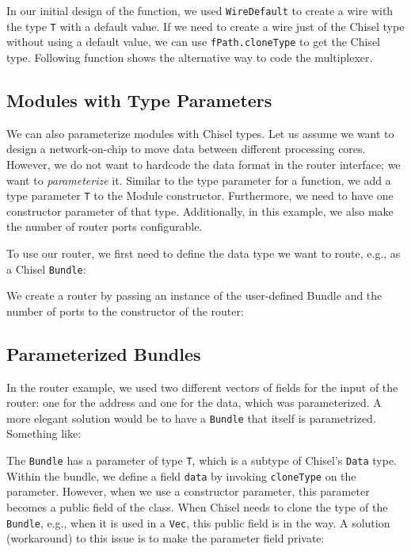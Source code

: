 \documentclass[%
    10pt,
    headinclude, footexclude,
    openright, %
    notitlepage,
    cleardoubleempty,
    headsepline,
    pointlessnumbers,
    bibtotoc, idxtotoc,
    ]{scrbook}
\newcommand{\code}[1]{{\small{\texttt{#1}}}}
\begin{document}

In our initial design of the function, we used \code{WireDefault}
to create a wire with the type \code{T} with a default value.
If we need to create a wire just of the Chisel type without using a default
value, we can use \code{fPath.cloneType} to get the Chisel type.
Following function shows the alternative way to code the multiplexer.


\subsection{Modules with Type Parameters}

We can also parameterize modules with Chisel types.
Let us assume we want to design a network-on-chip to move data between
different processing cores. However, we do not want to hardcode the
data format in the router interface; we want to \emph{parameterize} it.
Similar to the type parameter for a function, we add a type parameter \code{T}
to the Module constructor. Furthermore, we need to have one constructor
parameter of that type. Additionally, in this example, we also make the number
of router ports configurable.


\noindent To use our router, we first need to define the data type we want to route, e.g.,
as a Chisel \code{Bundle}:


\noindent We create a router by passing an instance of the user-defined Bundle and
the number of ports to the constructor of the router:


\subsection{Parameterized Bundles}

In the router example, we used two different vectors of fields for the input
of the router: one for the address and one for the data, which was parameterized.
A more elegant solution would be to have a \code{Bundle} that itself
is parametrized. Something like:


The \code{Bundle} has a parameter of type \code{T}, which is a subtype
of Chisel's \code{Data} type.
Within the bundle, we define a field \code{data} by invoking \code{cloneType}
on the parameter.
However, when we use a constructor parameter, this parameter becomes a
public field of the class. When Chisel needs to clone the type of the \code{Bundle},
e.g., when it is used in a \code{Vec}, this public field is in the way.
A solution (workaround) to this issue is to make the parameter field private:
\end{document}
